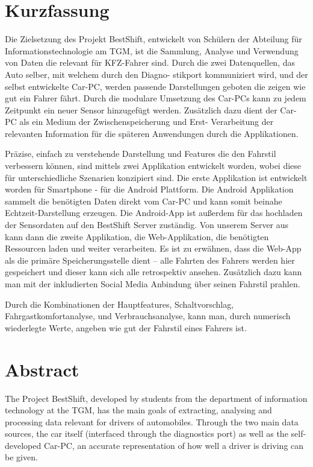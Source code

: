 \section*{Kurzfassung} 

Die Zielsetzung des Projekt BestShift, entwickelt von Schülern der Abteilung für Informationstechnologie am TGM, ist die Sammlung, Analyse und Verwendung von Daten die relevant für KFZ-Fahrer sind. Durch die zwei Datenquellen, das Auto selber, mit welchem durch den Diagno- stikport kommuniziert wird, und der selbst entwickelte Car-PC, werden passende Darstellungen geboten die zeigen wie gut ein Fahrer fährt. 
Durch die modulare Umsetzung des Car-PCs kann zu jedem Zeitpunkt ein neuer Sensor hinzugefügt werden. Zusätzlich dazu dient der Car-PC als ein Medium der Zwischenspeicherung und Erst- Verarbeitung der relevanten Information für die späteren Anwendungen durch die Applikationen. 

Präzise, einfach zu verstehende Darstellung und Features die den Fahrstil verbessern können, sind mittels zwei Applikation entwickelt worden, wobei diese für unterschiedliche Szenarien konzipiert sind. Die erste Applikation ist entwickelt worden für Smartphone - für die Android Plattform. Die Android Applikation sammelt die benötigten Daten direkt vom Car-PC und kann somit beinahe Echtzeit-Darstellung erzeugen. Die Android-App ist außerdem für das hochladen der Sensordaten auf den BestShift Server zuständig. Von unserem Server aus kann dann die zweite Applikation, die Web-Applikation, die benötigten Ressourcen laden und weiter verarbeiten. Es ist zu erwähnen, dass die Web-App als die primäre Speicherungsstelle dient – alle Fahrten des Fahrers werden hier gespeichert und dieser kann sich alle retrospektiv ansehen. Zusätzlich dazu kann man mit der inkludierten Social Media Anbindung über seinen Fahrstil prahlen. 

Durch die Kombinationen der Hauptfeatures, Schaltvorschlag, Fahrgastkomfortanalyse, und Verbrauchsanalyse, kann man, durch numerisch wiederlegte Werte, angeben wie gut der Fahrstil eines Fahrers ist.

\section*{Abstract} 

The Project BestShift, developed by students from the department of information technology at the TGM, has the main goals of extracting, analysing and processing data relevant for drivers of automobiles. Through the two main data sources, the car itself (interfaced through the diagnostics port) as well as the self-developed Car-PC, an accurate representation of how well a driver is driving can be given.

